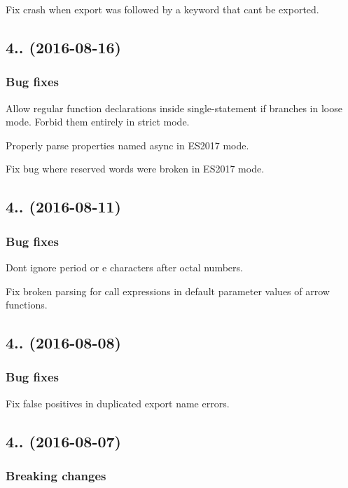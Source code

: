 Fix crash when {\ttfamily export} was followed by a keyword that can\textquotesingle{}t be exported.

\subsection*{4.. (2016-\/08-\/16)}

\subsubsection*{Bug fixes}

Allow regular function declarations inside single-\/statement {\ttfamily if} branches in loose mode. Forbid them entirely in strict mode.

Properly parse properties named {\ttfamily async} in E\+S2017 mode.

Fix bug where reserved words were broken in E\+S2017 mode.

\subsection*{4.. (2016-\/08-\/11)}

\subsubsection*{Bug fixes}

Don\textquotesingle{}t ignore period or \textquotesingle{}e\textquotesingle{} characters after octal numbers.

Fix broken parsing for call expressions in default parameter values of arrow functions.

\subsection*{4.. (2016-\/08-\/08)}

\subsubsection*{Bug fixes}

Fix false positives in duplicated export name errors.

\subsection*{4.. (2016-\/08-\/07)}

\subsubsection*{Breaking changes}

